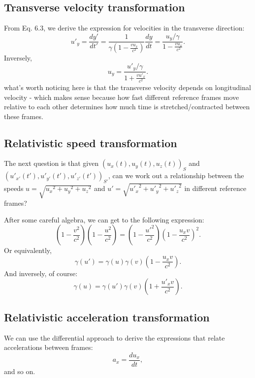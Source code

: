 \documentclass[a4paper,11pt]{article}
\numberwithin{equation}{section}
\begin{document}
 \subsection{Transverse velocity transformation}
 From Eq. 6.3, we derive the expression for velocities in the transverse direction:
 \begin{equation}
 {u'}_y=\frac{dy'}{dt'}=\frac{1}{\gamma\left( 1-\frac{vu_x}{c^2}\right) }\frac{dy}{dt} = \frac{u_y/\gamma}{1-\frac{vu_x}{c^2}}.
 \end{equation}
 Inversely,
 \begin{equation}
 u_y=\frac{{u'}_y/\gamma}{1+\frac{v{u'}_x}{c^2}}.
 \end{equation}
 what's worth noticing here is that the transverse velocity depends on longitudinal velocity - which makes sense because how fast different reference frames move relative to each other determines how much time is stretched/contracted between these frames. 
 \subsection{Relativistic speed transformation}
 The next question is that given $\left( u_x(t),u_y(t),u_z(t)\right)_S$ and $\left( {u'}_{x'}(t'),{u'}_{y'}(t'),{u'}_{z'}(t')\right)_{S'}$, can we work out a relationship between the speeds $u = \sqrt{{u_x}^2+{u_y}^2+{u_z}^2}$ and $u'=\sqrt{{{u'}_x}^2+{{u'}_y}^2+{{u'}_z}^2}$ in different reference frames? 
 
 \noindent After some careful algebra, we can get to the following expression:
 \begin{equation}
 \left(1-\frac{v^2}{c^2} \right) \left( 1-\frac{u^2}{c^2}\right) =\left( 1-\frac{{u'}^2}{c^2}\right) \left( 1-\frac{u_xv}{c^2}\right)^2. 
 \end{equation}
 Or equivalently,
 \begin{equation}
 \gamma(u')=\gamma(u)\gamma(v)\left( 1-\frac{u_xv}{c^2}\right).
 \end{equation}
 And inversely, of course:
 \begin{equation}
 \gamma(u)=\gamma(u')\gamma(v)\left( 1+\frac{{u'}_xv}{c^2}\right).
 \end{equation}
 \subsection{Relativistic acceleration transformation}
 We can use the differential approach to derive the expressions that relate accelerations between frames:
 \begin{equation*}
 a_x=\frac{du_x}{dt},
 \end{equation*}
 and so on.
 
\end{document}
